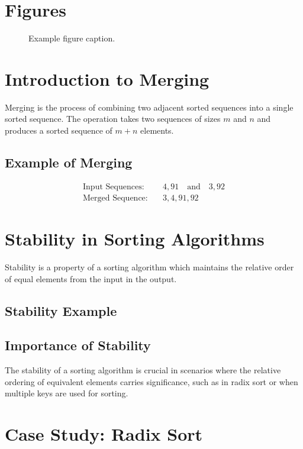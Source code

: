 \documentclass[12pt,openany]{book}
\theoremstyle{definition}
\begin{document}
	\section{Figures}
	\begin{figure}[h!]
		\centering
		\caption{Example figure caption.}
	\end{figure}

	\section{Introduction to Merging}
	Merging is the process of combining two adjacent sorted sequences into a single sorted sequence. The operation takes two sequences of sizes \( m \) and \( n \) and produces a sorted sequence of \( m + n \) elements.
	
	\subsection{Example of Merging}
	\begin{align*}
		\text{Input Sequences:} &\quad 4, 91 \quad \text{and} \quad 3, 92 \\
		\text{Merged Sequence:} &\quad 3, 4, 91, 92
	\end{align*}
	
	\section{Stability in Sorting Algorithms}
	Stability is a property of a sorting algorithm which maintains the relative order of equal elements from the input in the output.
	
	\subsection{Stability Example}
	
	\subsection{Importance of Stability}
	The stability of a sorting algorithm is crucial in scenarios where the relative ordering of equivalent elements carries significance, such as in radix sort or when multiple keys are used for sorting.
	
	\section{Case Study: Radix Sort}
\end{document}
